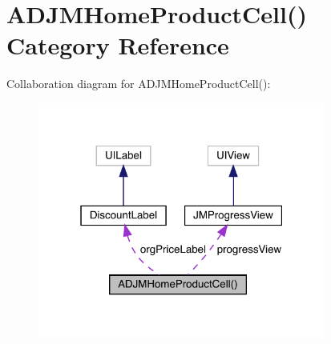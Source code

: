 \hypertarget{category_a_d_j_m_home_product_cell_07_08}{}\section{A\+D\+J\+M\+Home\+Product\+Cell() Category Reference}
\label{category_a_d_j_m_home_product_cell_07_08}


Collaboration diagram for A\+D\+J\+M\+Home\+Product\+Cell()\+:\nopagebreak
\begin{figure}[H]
\begin{center}
\leavevmode
\includegraphics[width=268pt]{category_a_d_j_m_home_product_cell_07_08__coll__graph}
\end{center}
\end{figure}
